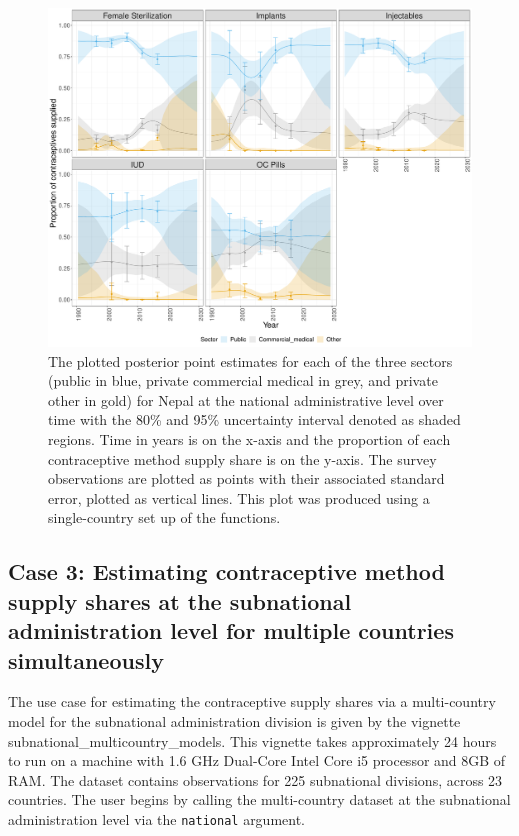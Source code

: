 \begin{figure}[H]
\includegraphics[width=1\linewidth,height=0.4\textheight]{figures/fig_4} \caption{The plotted posterior point estimates for each of the three sectors (public in blue, private commercial medical in grey, and private other in gold) for Nepal at the national administrative level over time with the 80\% and 95\% uncertainty interval denoted as shaded regions. Time in years is on the x-axis and the proportion of each contraceptive method supply share is on the y-axis. The survey observations are plotted as points with their associated standard error, plotted as vertical lines. This plot was produced using a single-country set up of the  functions.}\label{fig:fig-4}
\end{figure}

\hypertarget{case-3-estimating-contraceptive-method-supply-shares-at-the-subnational-administration-level-for-multiple-countries-simultaneously}{%
\subsection{Case 3: Estimating contraceptive method supply shares at the subnational administration level for multiple countries simultaneously}\label{case-3-estimating-contraceptive-method-supply-shares-at-the-subnational-administration-level-for-multiple-countries-simultaneously}}

The use case for estimating the contraceptive supply shares via a multi-country model for the subnational administration division is given by the vignette subnational\_multicountry\_models. This vignette takes approximately 24 hours to run on a machine with 1.6 GHz Dual-Core Intel Core i5 processor and 8GB of RAM. The dataset contains observations for 225 subnational divisions, across 23 countries. The user begins by calling the multi-country dataset at the subnational administration level via the \texttt{national} argument.

